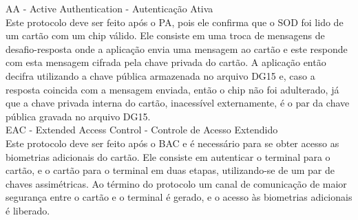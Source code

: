 \documentclass{article}
\begin{document}
\begin{justify}
			\hspace*{2cm} AA - Active Authentication - Autenticação Ativa\\
			\hspace*{2cm} Este protocolo deve ser feito após o PA, pois ele confirma que o SOD foi lido de um cartão com um chip válido. Ele consiste em uma troca de mensagens de desafio-resposta onde a aplicação envia uma mensagem ao cartão e este responde com esta mensagem cifrada pela chave privada do cartão. A aplicação então decifra utilizando a chave pública armazenada no arquivo DG15 e, caso a resposta coincida com a mensagem enviada, então o chip não foi adulterado, já que a chave privada interna do cartão, inacessível externamente, é o par da chave pública gravada no arquivo DG15.\\
			
			\hspace*{2cm} EAC - Extended Access Control - Controle de Acesso Extendido\\
			\hspace*{2cm} Este protocolo deve ser feito após o BAC e é necessário para se obter acesso as biometrias adicionais do cartão. Ele consiste em autenticar o terminal para o cartão, e o cartão para o terminal em duas etapas, utilizando-se de um par de chaves assimétricas. Ao término do protocolo um canal de comunicação de maior segurança entre o cartão e o terminal é gerado, e o acesso às biometrias adicionais é liberado.
			
		\end{justify}
\end{document}
